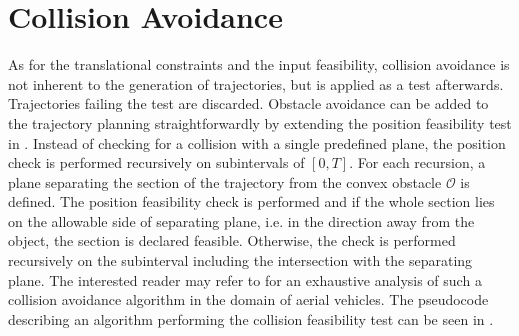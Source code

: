 \section{Collision Avoidance}\label{sec:collision-avoidance}
As for the translational constraints and the input feasibility, collision avoidance is not inherent to the generation of trajectories, but is applied as a test afterwards. Trajectories failing the test are discarded.
Obstacle avoidance can be added to the trajectory planning straightforwardly by extending the position feasibility test in .
Instead of checking for a collision with a single predefined plane, the position check is performed recursively on subintervals of $\left[0, T\right]$.
For each recursion, a plane separating the section of the trajectory from the convex obstacle $\mathcal{O}$ is defined.
The position feasibility check is performed and if the whole section lies on the allowable side of separating plane, i.e. in the direction away from the object, the section is declared feasible.
Otherwise, the check is performed recursively on the subinterval including the intersection with the separating plane.
The interested reader may refer to \cite{Bucki19} for an exhaustive analysis of such a collision avoidance algorithm in the domain of aerial vehicles.
The pseudocode describing an algorithm performing the collision feasibility test can be seen in .
